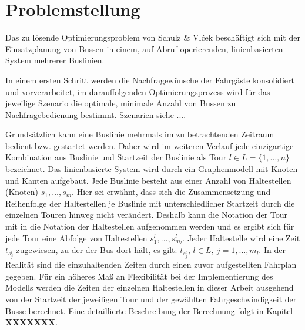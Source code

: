 \chapter{Problemstellung}
\label{chapter:3}
\label{chapter:Problemstellung}
Das zu lösende Optimierungsproblem von Schulz \& Vlćek beschäftigt sich mit der Einsatzplanung von Bussen in einem, auf Abruf operierenden, linienbasierten System mehrerer Buslinien. 

In einem ersten Schritt werden die Nachfragewünsche der Fahrgäste konsolidiert und vorverarbeitet, im darauffolgenden Optimierungsprozess wird für das jeweilige Szenario die optimale, minimale Anzahl von Bussen zu Nachfragebedienung bestimmt. Szenarien siehe ....




Grundsätzlich kann eine Buslinie mehrmals im zu betrachtenden Zeitraum bedient bzw. gestartet werden. 
Daher wird im weiteren Verlauf jede einzigartige Kombination aus Buslinie und Startzeit der Buslinie als Tour \( l \in L = \{1,  \dots , n\} \) bezeichnet. 
Das linienbasierte System wird durch ein Graphenmodell mit Knoten und Kanten aufgebaut. Jede Buslinie besteht aus einer Anzahl von Haltestellen (Knoten) $s_1, \dots, s_{m}$. Hier sei erwähnt, dass sich die Zusammensetzung und Reihenfolge der Haltestellen je Buslinie mit unterschiedlicher Startzeit durch die einzelnen Touren hinweg nicht verändert. Deshalb kann die Notation der Tour mit in die Notation der Haltestellen aufgenommen werden und es ergibt sich für jede Tour eine Abfolge von Haltestellen $s^l_1,  \dots , s^l_{m_l}$.
Jeder Haltestelle wird eine Zeit $\bar{t}_{s^l_j}$ zugewiesen, zu der der Bus dort hält, es gilt: $\bar{t}_{s^l_j}$, $l \in L,\ j = 1, \dots, m_l$.
In der Realität sind die einzuhaltenden Zeiten durch einen zuvor aufgestellten Fahrplan gegeben. Für ein höheres Maß an Flexibilität bei der Implementierung des Modells werden die Zeiten der einzelnen Haltestellen in dieser Arbeit ausgehend von der Startzeit der jeweiligen Tour und der gewählten Fahrgeschwindigkeit der Busse berechnet. Eine detaillierte Beschreibung der Berechnung folgt in Kapitel \textbf{XXXXXXX}.


